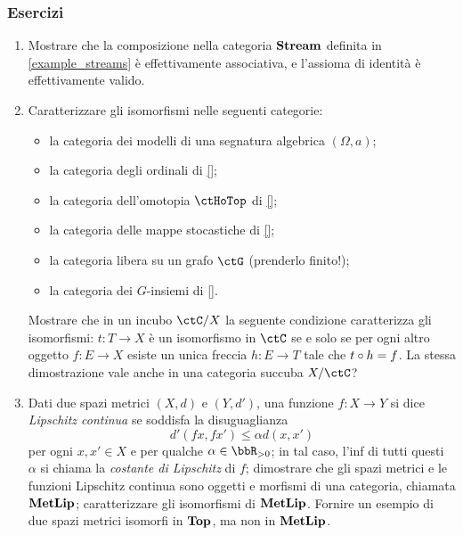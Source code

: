 \subsubsection*{Esercizi}
\begin{enumerate}
	\item Mostrare che la composizione nella categoria \(\mathbf{Stream}\) definita in \ref{example_streams} è effettivamente associativa, e l'assioma di identità è effettivamente valido. %
	\item Caratterizzare gli isomorfismi nelle seguenti categorie:
	\begin{itemize}
		\item la categoria dei modelli di una segnatura algebrica $(\Omega,a)$;
		\item la categoria degli ordinali di \ref{};
		\item la categoria dell'omotopia $\ctHoTop$ di \ref{};
		\item la categoria delle mappe stocastiche di \ref{};
		\item la categoria libera su un grafo $\ctG$ (prenderlo finito!);
		\item la categoria dei $G$-insiemi di \ref{}.
	\end{itemize}
	Mostrare che in un incubo $\ctC/X$ la seguente condizione caratterizza gli isomorfismi: $t : T\to X$ è un isomorfismo in $\ctC$ se e solo se per ogni altro oggetto $f : E\to X$ esiste un unica freccia $h : E\to T$ tale che $t\circ h=f$. La stessa dimostrazione vale anche in una categoria succuba $X/\ctC$?
	\item Dati due spazi metrici \((X,d)\) e \((Y,d')\), una funzione \(f:X\to Y\) si dice \emph{Lipschitz continua} se soddisfa la disuguaglianza
	      \[
		      d'(fx,fx')\le \alpha d(x,x')
	      \]
	      per ogni \(x,x'\in X\) e per qualche \(\alpha\in\bbR_{>0}\); in tal caso, l'inf di tutti questi \(\alpha\) si chiama la \emph{costante di Lipschitz} di \(f\); dimostrare che gli spazi metrici e le funzioni Lipschitz continua sono oggetti e morfismi di una categoria, chiamata \(\mathbf{MetLip}\); caratterizzare gli isomorfismi di \(\mathbf{MetLip}\). Fornire un esempio di due spazi metrici isomorfi in \(\mathbf{Top}\), ma non in \(\mathbf{MetLip}\).


\end{enumerate}
